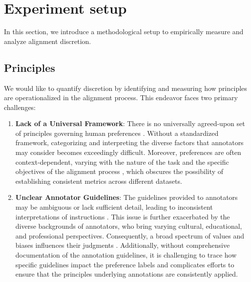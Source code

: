 \documentclass{article}
\begin{document}
\section{Experiment setup}\label{sec:setup}
In this section, we introduce a methodological setup to empirically measure and analyze alignment discretion.

\subsection{Principles}\label{sec:principles}
We would like to quantify discretion by identifying and measuring how principles are operationalized in the alignment process. This endeavor faces two primary challenges:
\begin{enumerate}
    \item \textbf{Lack of a Universal Framework}: There is no universally agreed-upon set of principles governing human preferences \cite{rao-etal-2023-ethical}. Without a standardized framework, categorizing and interpreting the diverse factors that annotators may consider becomes exceedingly difficult. Moreover, preferences are often context-dependent, varying with the nature of the task and the specific objectives of the alignment process  \cite{tversky1993, pitis2024improvingcontextawarepreferencemodeling}, which obscures the possibility of establishing consistent metrics across different datasets. 
    
    \item \textbf{Unclear Annotator Guidelines}:  The guidelines provided to annotators may be ambiguous or lack sufficient detail, leading to inconsistent interpretations of instructions \cite{D_az_2022, Geiger_2020}. This issue is further exacerbated by the diverse backgrounds of annotators, who bring varying cultural, educational, and professional perspectives. Consequently, a broad spectrum of values and biases influences their judgments \cite{sap-etal-2022-annotators, prabhakaran-etal-2021-releasing}. Additionally, without comprehensive documentation of the annotation guidelines, it is challenging to trace how specific guidelines impact the preference labels \cite{parmar-etal-2023-dont} and complicates efforts to ensure that the principles underlying annotations are consistently applied. 
\end{enumerate}
\end{document}
